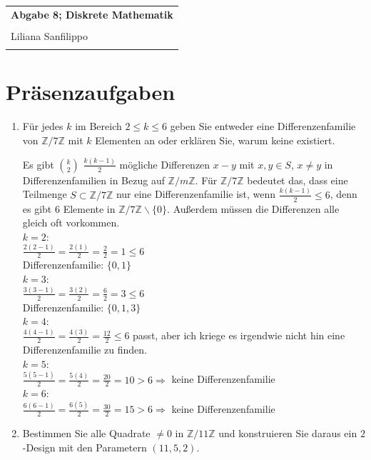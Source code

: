 \documentclass{article} %
\newcommand{\titulo}{Abgabe 8; Diskrete Mathematik}
\newcommand{\nombre}{Liliana Sanfilippo}
\begin{document}
\begin{tabular}{p{12cm}}
{{\Large\bf\titulo}}\\
\vspace{0.2cm}\\
 {\large\nombre}\\
 \vspace{0.2cm}\\   
\end{tabular}


\section*{Präsenzaufgaben}

\begin{enumerate}
    \item Für jedes $k$ im Bereich $2 \leq k \leq 6$ geben Sie entweder eine Differenzenfamilie von $\mathbb{Z}/7\mathbb{Z}$ mit $k$ Elementen an oder erklären Sie, warum keine existiert.
    \begin{mybox}
    Es gibt $\binom{k}{2}$ $\frac{k(k-1)}{2}$ mögliche Differenzen $x-y$ mit $x, y \in S$, $x \neq y$ in Differenzenfamilien in Bezug auf $\mathbb{Z}/m\mathbb{Z}$. Für $\mathbb{Z}/7\mathbb{Z}$ bedeutet das, dass eine Teilmenge $S \subset \mathbb{Z}/7\mathbb{Z}$ nur eine Differenzenfamilie ist, wenn $\frac{k(k-1)}{2} \leq 6$, denn es gibt 6 Elemente in $\mathbb{Z}/7\mathbb{Z} \backslash \{0\}$. Außerdem müssen die Differenzen alle gleich oft vorkommen. 
    \\ $k = 2$: \\
    $\frac{2(2-1)}{2} =  \frac{2(1)}{2} = \frac{2}{2} = 1 \leq 6$ \\
    Differenzenfamilie: $\{0,1\}$ 
   \\ $k = 3$: \\
   $\frac{3(3-1)}{2} =  \frac{3(2)}{2} = \frac{6}{2} = 3 \leq 6$ \\
    Differenzenfamilie: $\{0,1,3\}$ 
    \\ $k = 4$: \\
     $\frac{4(4-1)}{2} =  \frac{4(3)}{2} = \frac{12}{2} \leq 6$ passt, aber ich kriege es irgendwie nicht hin eine Differenzenfamilie zu finden.  
   \\ $k = 5$: \\
   $\frac{5(5-1)}{2} =  \frac{5(4)}{2} = \frac{20}{2} = 10 > 6 \Rightarrow $ keine Differenzenfamilie  
    \\ $k = 6$: \\
    $\frac{6(6-1)}{2} =  \frac{6(5)}{2} = \frac{30}{2} = 15 > 6 \Rightarrow $ keine Differenzenfamilie  
    \end{mybox}
    \item Bestimmen Sie alle Quadrate $\neq 0$ in $\mathbb{Z}/11\mathbb{Z}$ und konstruieren Sie daraus ein $2$-Design mit den Parametern $(11, 5, 2)$.
\end{enumerate}
\newpage 
\end{document}

